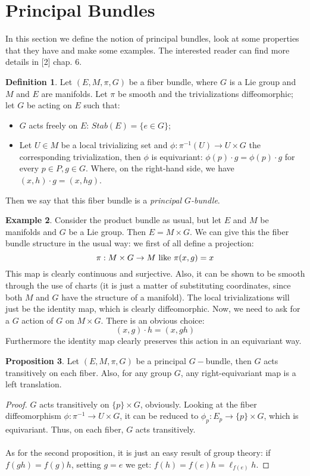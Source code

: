 \documentclass[12pt,a4paper]{report}
\theoremstyle{definition}
\newtheorem{Def}{Definition}[chapter]
\theoremstyle{Theorem}
\newtheorem{Prop}[Def]{Proposition}
\theoremstyle{definition}
\newtheorem{Ex}[Def]{Example}
\theoremstyle{definition}
\begin{document}
	\section{Principal Bundles}
	In this section we define the notion of principal bundles, look at some properties that they have and make some examples. The interested reader can find more details in [2] chap. 6.
	\begin{Def}
		Let $(E,M,\pi,G)$ be a fiber bundle, where $G$ is a Lie group and $M$ and $E$ are manifolds. Let $\pi$ be smooth and the trivializations diffeomorphic; let $G$ be acting on $E$ such that:
		\begin{itemize}
			\item $G$ acts freely on $E$: $Stab(E)=\{e\in G\}$;
			\item Let $U\in M$ be a local trivializing set and $\phi:\pi^{-1}(U)\rightarrow U\times G$  the corresponding trivialization, then $\phi$ is equivariant: $\phi(p)\cdot g=\phi(p)\cdot g$ for every $p\in P,g\in G$. Where, on the right-hand side, we have $(x,h)\cdot g=(x,hg)$.
		\end{itemize} 
		Then we say that this fiber bundle is a \textit{principal $G$-bundle}.
	\end{Def}
	\begin{Ex}
		Consider the product bundle as usual, but let $E$ and $M$ be manifolds and $G$ be a Lie group. Then $E=M\times G$. We can give this the fiber bundle structure in the usual way: we first of all define a projection:
		$$\pi:M\times G\rightarrow M\hbox{ like }\pi(x,g)=x$$
		This map is clearly continuous and surjective. Also, it can be shown to be smooth through the use of charts (it is just a matter of substituting coordinates, since both $M$ and $G$ have the structure of a manifold). The local trivializations will just be the identity map, which is clearly diffeomorphic. Now, we need to ask for a $G$ action of $G$ on $M\times G$. There is an obvious choice:
		$$(x,g)\cdot h=(x,gh)$$
		Furthermore the identity map clearly preserves this action in an equivariant way.
	\end{Ex}
	\begin{Prop} \label{Prop_3.5.1}
		Let $(E,M,\pi,G)$ be a principal $G-$bundle, then $G$ acts transitively on each fiber. Also, for any group $G$, any right-equivariant map is a left translation.
	\end{Prop}
	\begin{proof}
		$G$ acts transitively on $\{p\} \times G$, obviously. Looking at the fiber diffeomorphism $\phi:\pi^{-1}\rightarrow U\times G$, it can be reduced to $\phi_p:E_p\rightarrow \{p\}\times G$, which is equivariant. Thus, on each fiber, $G$ acts transitively.\\
		\\
		As for the second proposition, it is just an easy result of group theory: if $f(gh)=f(g)h$, setting $g=e$ we get: $f(h)=f(e)h=\ell_{f(e)}h$.
	\end{proof}
\end{document}
